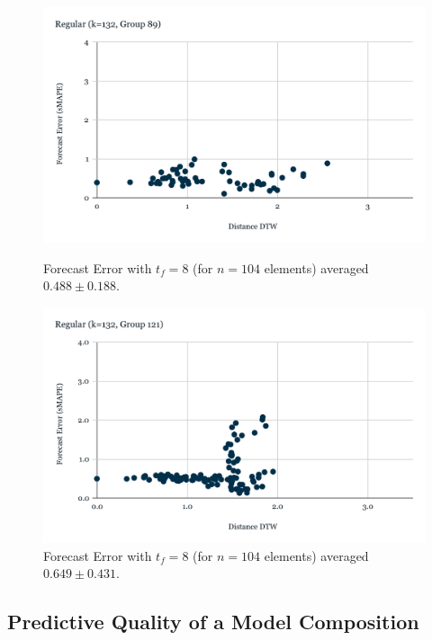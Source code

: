 \begin{figure}[!htbp]
  \centering
  \begin{minipage}[b]{0.45\textwidth}
    \includegraphics[width=\textwidth]{../Figures/distDTW_ForecastError_r132_c89}
    \caption{Forecast Error with $t_{f}=8$ (for $n=104$ elements) averaged $0.488 \pm 0.188$.}
    \label{Fig:DTWsMAPE_r132_c89}
  \end{minipage}
  \hfill
  \begin{minipage}[b]{0.45\textwidth}
    \includegraphics[width=\textwidth]{../Figures/distDTW_ForecastError_r132_c121}
    \caption{Forecast Error with $t_{f}=8$ (for $n=104$ elements) averaged $0.649 \pm 0.431$.}
    \label{Fig:DTWsMAPE_r132_c121}
  \end{minipage}
\end{figure}

\subsection{Predictive Quality of a Model Composition}
\label{Sec:MedoidsModelComposition}

